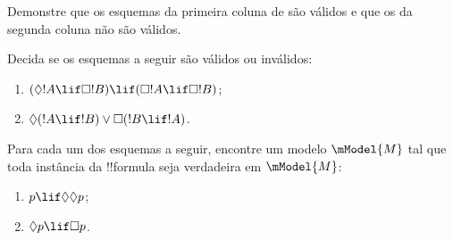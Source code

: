 \documentclass[../../../include/open-logic-section]{subfiles}
\begin{document}
\begin{prob}%
  Demonstre que os esquemas da primeira coluna de
   são válidos e que os da
  segunda coluna não são válidos.
\end{prob}

\begin{prob}
  Decida se os esquemas a seguir são válidos ou inválidos:
  \begin{enumerate}
  \item $(\Diamond !A \lif \Box !B) \lif (\Box !A \lif \Box
    !B)$;
  \item $\Diamond(!A \lif !B) \lor \Box(!B \lif !A)$.
  \end{enumerate}
\end{prob}

\begin{prob}
  Para cada um dos esquemas a seguir, encontre um modelo $\mModel{M}$
  tal que toda instância da !!{formula} seja verdadeira em $\mModel{M}$:
  \begin{enumerate}
  \item $p \lif \Diamond\Diamond p$;
  \item $\Diamond p \lif \Box p$.
  \end{enumerate}
\end{prob}
\end{document}
